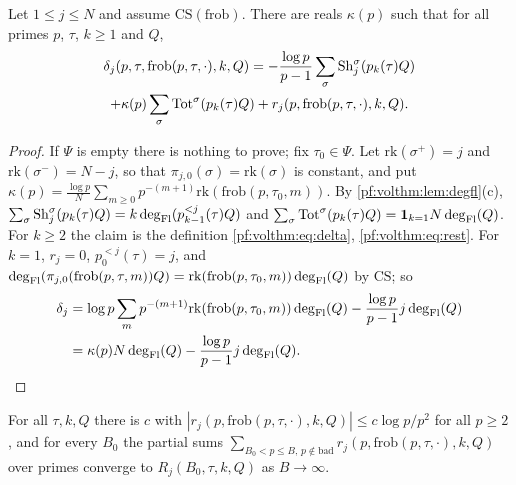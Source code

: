 \begin{lemma}\label{pf:volthm:lem:deltadecomp}
Let $1\le j\le N$ and assume $\mathrm{CS}(\mathrm{frob})$. There are reals $\kappa(p)$ such that for all
primes $p$, $\tau$, $k\ge1$ and $Q$,
\begin{multline*}
\delta_j(p,\tau,\mathrm{frob}(p,\tau,\cdot),k,Q)=-\frac{\log p}{p-1}\sum_\sigma\mathrm{Sh}_j^\sigma(p_k(\tau)Q)\\
+\kappa(p)\sum_\sigma\mathrm{Tot}^\sigma(p_k(\tau)Q)+r_j(p,\mathrm{frob}(p,\tau,\cdot),k,Q).
\end{multline*}
\end{lemma}

\begin{proof}
If $\Psi$ is empty there is nothing to prove; fix $\tau_0\in\Psi$. Let $\mathrm{rk}(\sigma^+)=j$ and
$\mathrm{rk}(\sigma^-)=N-j$, so that $\pi_{j,0}(\sigma)=\mathrm{rk}(\sigma)$ is constant, and put
$\kappa(p)=\frac{\log p}N\sum_{m\ge0}p^{-(m+1)}\mathrm{rk}(\mathrm{frob}(p,\tau_0,m))$. By
\cref{pf:volthm:lem:degfl}(c), $\sum_\sigma\mathrm{Sh}_j^\sigma(p_k(\tau)Q)=k\deg_{\mathrm{Fl}}(p^{<j}_{k-1}(\tau)Q)$ and
$\sum_\sigma\mathrm{Tot}^\sigma(p_k(\tau)Q)=\mathbf 1_{k=1}N\deg_{\mathrm{Fl}}(Q)$. For $k\ge2$ the claim is the definition
\eqref{pf:volthm:eq:delta}, \eqref{pf:volthm:eq:rest}. For $k=1$, $r_j=0$, $p^{<j}_0(\tau)=j$, and
$\deg_{\mathrm{Fl}}(\pi_{j,0}(\mathrm{frob}(p,\tau,m))Q)=\mathrm{rk}(\mathrm{frob}(p,\tau_0,m))\deg_{\mathrm{Fl}}(Q)$ by
$\mathrm{CS}$; so
\begin{align*}
\delta_j&=\log p\sum_mp^{-(m+1)}\mathrm{rk}(\mathrm{frob}(p,\tau_0,m))\deg_{\mathrm{Fl}}(Q)-\frac{\log p}{p-1}j\deg_{\mathrm{Fl}}(Q)\\
&=\kappa(p)N\deg_{\mathrm{Fl}}(Q)-\frac{\log p}{p-1}j\deg_{\mathrm{Fl}}(Q).
\end{align*}
\end{proof}

\begin{lemma}\label{pf:volthm:lem:rest-summable}
For all $\tau,k,Q$ there is $c$ with $|r_j(p,\mathrm{frob}(p,\tau,\cdot),k,Q)|\le c\log p/p^2$ for all $p\ge2$, and
for every $B_0$ the partial sums $\sum_{B_0<p\le B,\,p\notin\mathrm{bad}}r_j(p,\mathrm{frob}(p,\tau,\cdot),k,Q)$ over
primes converge to $R_j(B_0,\tau,k,Q)$ as $B\to\infty$.
\end{lemma}

